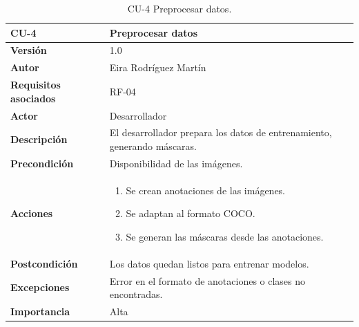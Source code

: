 \begin{table}[!h]
	\centering
	\begin{tabularx}{\linewidth}{ p{} p{} }
		\toprule
		\textbf{CU-4}    & \textbf{Preprocesar datos}\\
		\toprule
		\textbf{Versión}              & 1.0    \\
		\textbf{Autor}                & Eira Rodríguez Martín \\
		\textbf{Requisitos asociados} & RF-04 \\
        \textbf{Actor}                & Desarrollador \\
		\textbf{Descripción}          & El desarrollador prepara los datos de entrenamiento, generando máscaras.\\
		\textbf{Precondición}         & Disponibilidad de las imágenes. \\
		\textbf{Acciones}             &
		\begin{enumerate}
			\def\labelenumi{\arabic{enumi}.}
			\tightlist
			\item Se crean anotaciones de las imágenes.
			\item Se adaptan al formato COCO.
            \item Se generan las máscaras desde las anotaciones.
		\end{enumerate}\\
		\textbf{Postcondición}        & Los datos quedan listos para entrenar modelos. \\
		\textbf{Excepciones}          & Error en el formato de anotaciones o clases no encontradas. \\
		\textbf{Importancia}          & Alta \\
		\bottomrule
	\end{tabularx}
	\caption{CU-4 Preprocesar datos.}
\end{table}

